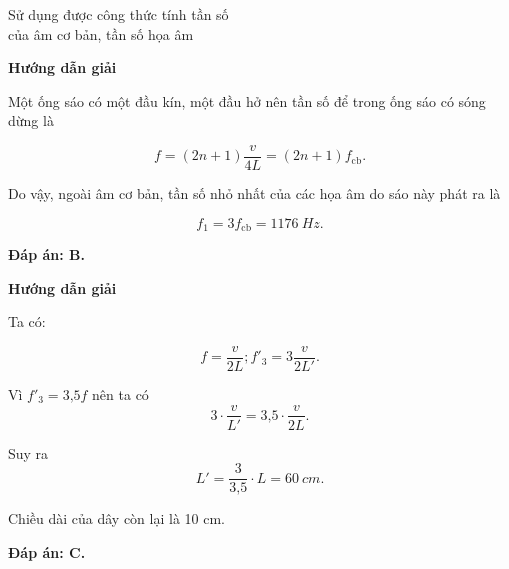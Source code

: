 \begin{dang}{Sử dụng được công thức tính tần số\\ của âm cơ bản, tần số họa âm}
	
	{\begin{center}
			\textbf{Hướng dẫn giải}
		\end{center}
		
		Một ống sáo có một đầu kín, một đầu hở nên tần số để trong ống sáo có sóng dừng là
		
		\begin{equation*}
			f=(2n+1)\dfrac{v}{4L} = (2n+1)f_\text{cb}.
		\end{equation*}
		
		Do vậy, ngoài âm cơ bản, tần số nhỏ nhất của các họa âm do sáo này phát ra là
		
		\begin{equation*}
			f_1 =3f_\text{cb} = \SI{1176}{Hz}.
		\end{equation*}
		
		
		\textbf{Đáp án: B.}
	}
	{\begin{center}
			\textbf{Hướng dẫn giải}
		\end{center}
		
		Ta có: 
		
		\begin{equation*}
			f =\dfrac{v}{2L}; f'_3 = 3\dfrac{v}{2L'}.
		\end{equation*}
		
		Vì $f'_3 =\text{3,5}f$ nên ta có 
		\begin{equation*}
			3\cdot \dfrac{v}{L'} = \text{3,5} \cdot \dfrac{v}{2L}.
		\end{equation*}
		
		Suy ra 
		\begin{equation*}
			L' = \dfrac{3}{\text{3,5}}\cdot L = \SI{60}{cm}.
		\end{equation*}
		
		Chiều dài của dây còn lại là 10 cm.
		
		\textbf{Đáp án: C.}
	}
	
	
\end{dang}


